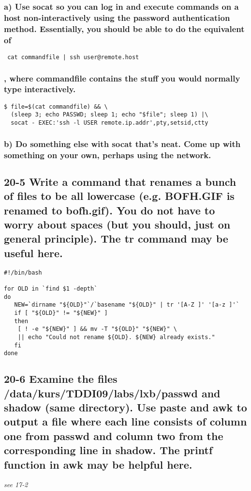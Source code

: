 \subsubsection{a) Use socat so you can log in and execute commands on a host non-interactively using the password authentication method. Essentially, you should be able to do the equivalent of}
\verb= cat commandfile | ssh user@remote.host =
\subsubsection{, where commandfile contains the stuff you would normally type interactively.}
\begin{verbatim}
$ file=$(cat commandfile) && \
  (sleep 3; echo PASSWD; sleep 1; echo "$file"; sleep 1) |\
  socat - EXEC:'ssh -l USER remote.ip.addr',pty,setsid,ctty
\end{verbatim}

\subsubsection{b) Do something else with socat that's neat. Come up with something on your own, perhaps using the network.}

\subsection{20-5 Write a command that renames a bunch of files to be all lowercase (e.g. BOFH.GIF is renamed to bofh.gif). You do not have to worry about spaces (but you should, just on general principle). The tr command may be useful here.}
\begin{verbatim}
#!/bin/bash

for OLD in `find $1 -depth`
do
   NEW=`dirname "${OLD}"`/`basename "${OLD}" | tr '[A-Z ]' '[a-z ]'`
   if [ "${OLD}" != "${NEW}" ]
   then
	[ ! -e "${NEW}" ] && mv -T "${OLD}" "${NEW}" \
	|| echo "Could not rename ${OLD}. ${NEW} already exists."
   fi
done
\end{verbatim}

\subsection{20-6 Examine the files /data/kurs/TDDI09/labs/lxb/passwd and shadow (same directory). Use paste and awk to output a file where each line consists of column one from passwd and column two from the corresponding line in shadow. The printf function in awk may be helpful here.}
\emph{see 17-2}


